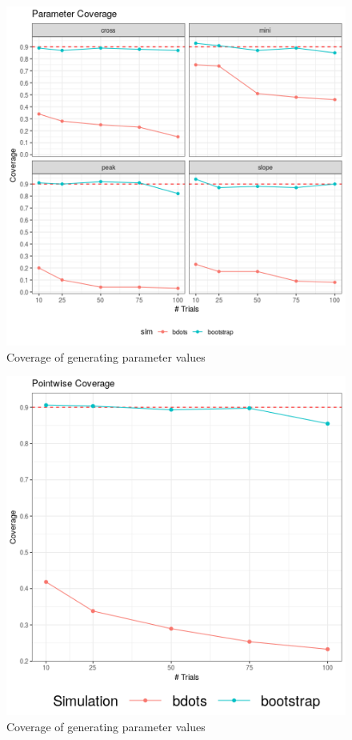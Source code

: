 \documentclass{article}
\begin{document}
\begin{figure}
\centering
\includegraphics[scale=0.65]{img/par_coverage.png}
\caption{Coverage of generating parameter values}
\end{figure}

\begin{figure}
\centering
\includegraphics[scale=0.5]{img/pointwise_cover.png}
\caption{Coverage of generating parameter values}
\end{figure}
\end{document}
